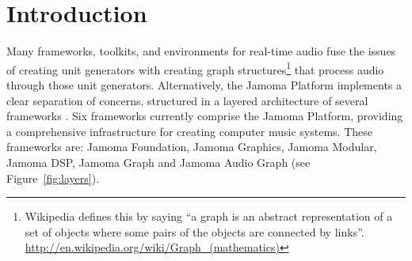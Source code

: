 \documentclass[twoside,a4paper]{article}
\title{\papertitle}
\begin{document}

\maketitle
\sloppy


%
\begin{abstract} %
%
%
Jamoma Audio Graph is a framework for creating graph structures in which unit generators are connected together to process dynamic multichannel audio in real-time.  
These graph structures are particularly well-suited to spatial audio contexts demanding large numbers of audio channels, such as Higher Order Ambisonics, Wave Field Synthesis and microphone arrays for beamforming.
This framework forms part of the Jamoma layered architecture for interactive systems, with current implementations of Jamoma Audio Graph targeting the Max/MSP, PureData, Ruby, and AudioUnit environments.

\end{abstract} %




%
\section{Introduction} %
%

\label{sec:intro}

Many frameworks, toolkits, and environments for real-time audio fuse the issues of creating unit generators with creating graph structures\footnote{Wikipedia defines this by saying ``a graph is an abstract representation of a set of objects where some pairs of the objects are connected by links''. \url{http://en.wikipedia.org/wiki/Graph_(mathematics)}} that process audio through those unit generators.
Alternatively, the Jamoma Platform implements a clear separation of concerns, structured in a layered architecture of several frameworks \cite{Place:2010}.
Six frameworks currently comprise the Jamoma Platform, providing a comprehensive infrastructure for creating computer music systems. 
These frameworks are: Jamoma Foundation, Jamoma Graphics, Jamoma Modular, Jamoma DSP, Jamoma Graph and Jamoma Audio Graph (see Figure~\ref{fig:layers}).
\end{document}
